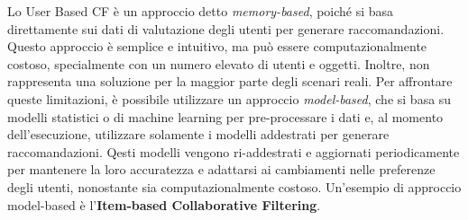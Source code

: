 \documentclass{report}
\begin{document}
	Lo User Based CF è un approccio detto \textit{memory-based}, poiché si basa direttamente sui dati di valutazione degli utenti per generare raccomandazioni. Questo approccio è semplice e intuitivo, ma può essere computazionalmente costoso, specialmente con un numero elevato di utenti e oggetti. Inoltre, non rappresenta una soluzione per la maggior parte degli scenari reali. Per affrontare queste limitazioni, è possibile utilizzare un approccio \textit{model-based}, che si basa su modelli statistici o di machine learning per pre-processare i dati e, al momento dell'esecuzione, utilizzare solamente i modelli addestrati per generare raccomandazioni. Qesti modelli vengono ri-addestrati e aggiornati periodicamente per mantenere la loro accuratezza e adattarsi ai cambiamenti nelle preferenze degli utenti, nonostante sia computazionalmente costoso. Un'esempio di approccio model-based è l'\textbf{Item-based Collaborative Filtering}.
\end{document}
